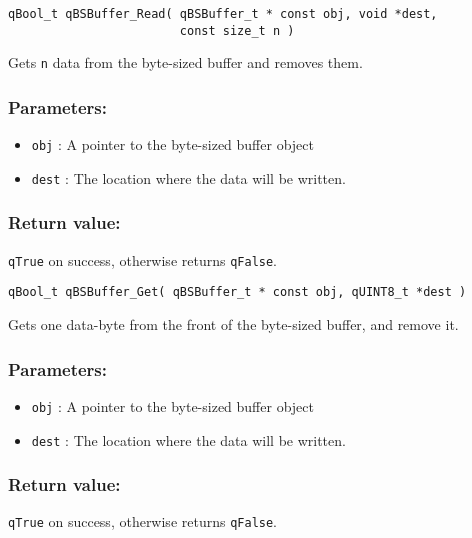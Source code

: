 \noindent\hrulefill

\begin{lstlisting}[style=CStyle]
qBool_t qBSBuffer_Read( qBSBuffer_t * const obj, void *dest, 
                        const size_t n )
\end{lstlisting}

Gets \lstinline{n} data from the byte-sized buffer and removes them. 

\subsubsection*{Parameters:}
\begin{itemize}
    \item \lstinline{obj} : A pointer to the byte-sized buffer object
    \item \lstinline{dest} : The location where the data will be written.
\end{itemize}

\subsubsection*{Return value:}
\lstinline{qTrue} on success, otherwise returns \lstinline{qFalse}.

\noindent\hrulefill

\begin{lstlisting}[style=CStyle]
qBool_t qBSBuffer_Get( qBSBuffer_t * const obj, qUINT8_t *dest )
\end{lstlisting}

Gets one data-byte from the front of the byte-sized buffer, and remove it. 

\subsubsection*{Parameters:}
\begin{itemize}
    \item \lstinline{obj} : A pointer to the byte-sized buffer object
    \item \lstinline{dest} : The location where the data will be written.
\end{itemize}

\subsubsection*{Return value:}
\lstinline{qTrue} on success, otherwise returns \lstinline{qFalse}.


